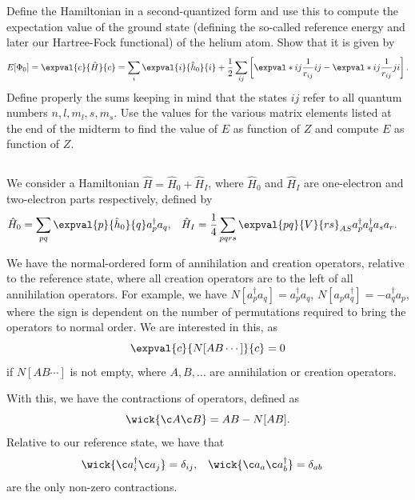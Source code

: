 Define the Hamiltonian in a second-quantized form and use this to compute the expectation value of the ground state (defining the so-called reference energy and later our Hartree-Fock functional) of
the helium atom.
Show that it is given by
\begin{equation}
    E[\Phi_0] = \expval{c}{\hat{H}}{c} = \sum_{i} \expval{i}{\hat{h}_0}{i} + \frac{1}{2} \sum_{ij} \left[\expval*{ij}{\frac{1}{r_{ij}}}{ij} - \expval*{ij}{\frac{1}{r_{ij}}}{ji}\right].
\end{equation}
Define properly the sums keeping in mind that the states $ij$ refer to all quantum numbers $n, l, m_l, s, m_s$.
Use the values for the various matrix elements listed at the end of the midterm to find the value of $E$ as function of $Z$ and compute $E$ as function of $Z$.

\subsection{}
We consider a Hamiltonian $\hat{H} = \hat{H}_0 + \hat{H}_I$, where $\hat{H}_0$ and $\hat{H}_I$ are one-electron and two-electron parts respectively, defined by
\begin{align}
    \hat{H}_0 &= \sum_{p q} \expval{p}{\hat{h}_0}{q} a_p^\dagger a_q, &
    \hat{H}_I &= \frac{1}{4} \sum_{pqrs} \expval{pq}{V}{rs}_{AS} a_p^\dagger a_q^\dagger a_s a_r.
\end{align}

We have the normal-ordered form of annihilation and creation operators, relative to the reference state, where all creation operators are to the left of all annihilation operators.
For example, we have $N[a_p^\dagger a_q] = a_p^\dagger a_q$, $N[a_p a_q^\dagger] = -a_q^\dagger a_p$, where the sign is dependent on the number of permutations required to bring the operators to normal order.
We are interested in this, as
\begin{equation*}
    \expval{c}{N[A B\dotsm]}{c} = 0
\end{equation*}
if $N[A B \dotsm]$ is not empty, where $A, B, \dotsc$ are annihilation or creation operators.

With this, we have the contractions of operators, defined as
\begin{equation*}
    \wick{\c A \c B} = AB - N[AB].
\end{equation*}
Relative to our reference state, we have that
\begin{align*}
    \wick{\c a_i^\dagger \c a_j} &= \delta_{i j}, &
    \wick{\c a_a \c a_b^\dagger} &= \delta_{a b}
\end{align*}
are the only non-zero contractions.

